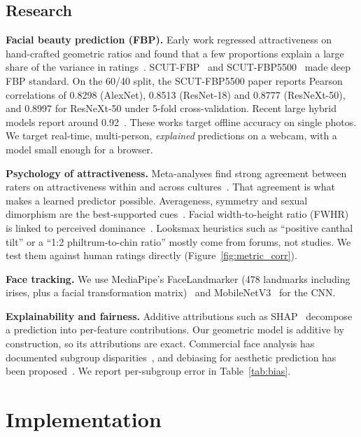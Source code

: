 \documentclass[sigconf,nonacm]{acmart}
\begin{document}
\subsection{Research}
\textbf{Facial beauty prediction (FBP).} Early work regressed attractiveness on hand-crafted geometric
ratios and found that a few proportions explain a large share of the variance in
ratings~\cite{eisenthal2006facial,kagian2008machine,gunes2006assessing}. SCUT-FBP~\cite{xie2015scut} and
SCUT-FBP5500~\cite{liang2018scut} made deep FBP standard. On the 60/40 split, the SCUT-FBP5500 paper reports
Pearson correlations of 0.8298 (AlexNet), 0.8513 (ResNet-18) and 0.8777 (ResNeXt-50), and 0.8997 for ResNeXt-50
under 5-fold cross-validation. Recent large hybrid models report around 0.92~\cite{boukhari2025synergynet}.
These works target offline accuracy on single photos. We target real-time, multi-person, \emph{explained}
predictions on a webcam, with a model small enough for a browser.

\textbf{Psychology of attractiveness.} Meta-analyses find strong agreement between raters on attractiveness
within and across cultures~\cite{langlois2000maxims}. That agreement is what makes a learned predictor
possible. Averageness, symmetry and sexual dimorphism are the best-supported cues~\cite{rhodes2006evolutionary}.
Facial width-to-height ratio (FWHR) is linked to perceived dominance~\cite{carre2008face}. Looksmax
heuristics such as ``positive canthal tilt'' or a ``1:2 philtrum-to-chin ratio'' mostly come from forums,
not studies. We test them against human ratings directly (Figure~\ref{fig:metric_corr}).

\textbf{Face tracking.} We use MediaPipe's FaceLandmarker (478 landmarks including irises, plus a
facial transformation matrix)~\cite{kartynnik2019facemesh,grishchenko2020attention} and
MobileNetV3~\cite{howard2019mobilenetv3} for the CNN.

\textbf{Explainability and fairness.} Additive attributions such as SHAP~\cite{lundberg2017unified}
decompose a prediction into per-feature contributions. Our geometric model is additive by construction,
so its attributions are exact. Commercial face analysis has documented subgroup
disparities~\cite{buolamwini2018gender}, and debiasing for aesthetic prediction has been
proposed~\cite{danner2021ethically}. We report per-subgroup error in Table~\ref{tab:bias}.

\section{Implementation}
\end{document}
